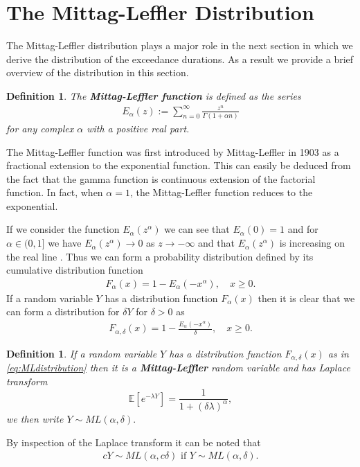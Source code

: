 \documentclass[honours,12pt]{unswthesis}
\newcommand{\E}{\mathbb{E}}
\newcommand{\1}{\mathbf 1}
\newtheorem{definition}[equation]{Definition}
\numberwithin{equation}{section}
\theoremstyle{definition}
\theoremstyle{remark}
\begin{document}
\section{The Mittag-Leffler Distribution}
The Mittag-Leffler distribution plays a major role in the next section in which we derive the distribution of the exceedance durations. As a result we provide a brief overview of the distribution in this section.
\begin{definition}\cite{Lin1998}
	The \textbf{Mittag-Leffler function} is defined as the series
	\begin{align*}
		E_\alpha(z):=\sum_{n=0}^\infty \frac{z^n}{\Gamma(1+\alpha n)}
	\end{align*}
	for any complex $\alpha$ with a positive real part.
\end{definition}
The Mittag-Leffler function was first introduced by Mittag-Leffler in 1903 as a fractional extension to the exponential function. This can easily be deduced from the fact that the gamma function is continuous extension of the factorial function. In fact, when $\alpha=1$, the Mittag-Leffler function reduces to the exponential.

If we consider the function $E_\alpha(z^\alpha)$ we can see that $E_\alpha(0)=1$ and for $\alpha \in (0,1]$ we have $E_\alpha(z^\alpha)\to0$ as $z\to-\infty$ \cite{Pillai1990} and that $E_\alpha(z^\alpha)$ is increasing on the real line \cite[Th~1]{Lin1998}. Thus we can form a probability distribution defined by its cumulative distribution function
\begin{align}
	F_\alpha(x)=1-E_\alpha(-x^\alpha),\quad x\geq0.
\end{align}
If a random variable $Y$ has a distribution function $F_\alpha(x)$ then it is clear that we can form a distribution for $\delta Y$ for $\delta>0$ as
\begin{align}\label{eq:MLdistribution}
	F_{\alpha,\delta}(x)=1-\frac{E_\alpha(-x^\alpha)}{\delta},\quad x\geq0.
\end{align}
\begin{definition}\label{def:MLlaplace}
	If a random variable $Y$ has a distribution function $F_{\alpha,\delta}(x)$ as in \ref{eq:MLdistribution} then it is a \textbf{Mittag-Leffler} random variable and has Laplace transform
	\[
		\E[e^{-\lambda Y}]=\frac{1}{1+(\delta\lambda)^\alpha},
	\]
	we then write $Y\sim ML(\alpha,\delta).$
\end{definition}
\noindent By inspection of the Laplace transform it can be noted that 
\begin{align}\label{eq:MLscale}
 cY\sim ML(\alpha,c\delta)\textrm{ if }Y\sim ML(\alpha,\delta).
\end{align}
\end{document}
